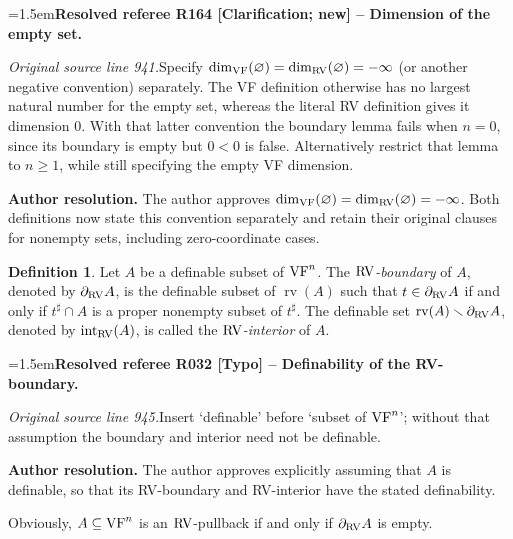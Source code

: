 \documentclass[12pt]{amsart}
\newcommand{\ResolvedRefereeRemark}[5]{%
  \par\medskip\begingroup\normalfont\small\color{gray}%
  \emergencystretch=1.5em\noindent\textbf{Resolved referee R#1 [#2] -- #3.}\par\nobreak\noindent #4\par
  \medskip\color{ResolutionGreen}\noindent\textbf{Author resolution.} #5\par
  \endgroup\medskip
}
\newcommand{\memph}[1]{{\color{magenta}\emph{#1}}}
\theoremstyle{plain}
\theoremstyle{definition}
\newtheorem{defn}[thm]{Definition}
\theoremstyle{remark}
\numberwithin{equation}{section}
\theoremstyle{plain}
\newcommand{\VF}{\textup{VF}}
\newcommand{\RV}{\textup{RV}}
\newcommand{\0}{\emptyset}
\newcommand{\sub}{\subseteq}
\newcommand{\mi}{\smallsetminus}
\DeclareMathOperator{\rv}{rv}
\DeclareMathOperator{\ito}{int}
\begin{document}
\ResolvedRefereeRemark{164}{Clarification; new}{Dimension of the empty set}{%
\textit{Original source line 941.}\quad Specify $\dim_{\VF}(\varnothing)=\dim_{\RV}(\varnothing)=-\infty$ (or another negative convention) separately. The VF definition otherwise has no largest natural number for the empty set, whereas the literal RV definition gives it dimension $0$. With that latter convention the boundary lemma fails when $n=0$, since its boundary is empty but $0<0$ is false. Alternatively restrict that lemma to $n\geq1$, while still specifying the empty VF dimension.
}{The author approves $\dim_{\VF}(\varnothing)=\dim_{\RV}(\varnothing)=-\infty$. Both definitions now state this convention separately and retain their original clauses for nonempty sets, including zero-coordinate cases.}

\begin{defn}
Let $A$ be a definable subset of $\VF^n$. The \memph{$\RV$-boundary} of $A$, denoted by $\partial_{\RV}A$, is the definable subset of $\rv(A)$ such that $t \in \partial_{\RV} A$ if and only if $t^\sharp \cap A$ is a proper nonempty subset of $t^\sharp$. The definable set $\rv(A) \mi \partial_{\RV}A$, denoted by $\ito_{\RV}(A)$, is called the \memph{$\RV$-interior} of $A$.
\end{defn}

\ResolvedRefereeRemark{032}{Typo}{Definability of the RV-boundary}{%
\textit{Original source line 945.}\quad Insert `definable' before `subset of $\VF^n$'; without that assumption the boundary and interior need not be definable.
}{The author approves explicitly assuming that $A$ is definable, so that its RV-boundary and RV-interior have the stated definability.}

Obviously, $A \sub \VF^n$ is an $\RV$-pullback if and only if $\partial_{\RV} A$ is empty.
\end{document}

